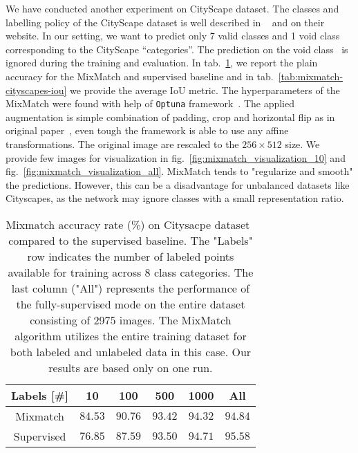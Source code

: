 We have conducted another experiment on CityScape dataset. The classes and labelling policy of the CityScape
dataset is well described in ~\cite{cityscapes-2016} and on their website. In our setting, we want to predict only 
7 valid classes and 1 void class corresponding to the CityScape ``categories''. The prediction on the void class \
is ignored during the training and evaluation. In tab.~\ref{tab:mixmatch-cityscapes}, we report the plain accuracy for 
the MixMatch and supervised baseline and in tab.~\ref{tab:mixmatch-cityscapes-iou} we provide the average $\mathrm{IoU}$ metric. 
The hyperparameters of the MixMatch were found with help of \texttt{Optuna} framework~\cite{optuna-2019}.
The applied augmentation is simple combination of padding, crop and horizontal flip as in original paper~\cite{mixmatch-2019}, even
tough the framework is able to use any affine transformations. The original image are rescaled to the $256 \times 512$ size.
We provide few images for visualization in fig.~\ref{fig:mixmatch_visualization_10} and fig.~\ref{fig:mixmatch_visualization_all}. 
MixMatch tends to "regularize and smooth" the predictions. However, this can be a disadvantage for unbalanced datasets 
like Cityscapes, as the network may ignore classes with a small representation ratio.

\begin{table}[tbh]
    \begin{tabular}{|c|c|c|c|c|c|}
    \hline
    Labels [\#]  & 10 & 100 & 500 & 1000 & All \\
    \hline
    Mixmatch & $84.53$ & $90.76$ & $93.42$ & $94.32$ & $94.84$ \\
    \hline
    Supervised & $76.85$ & $87.59$ & $93.50$ & $94.71$ & $95.58$ \\
    \hline
    \end{tabular}
    \caption[Mixmatch accuracy on CityScape]{Mixmatch accuracy rate (\%) on Citysacpe dataset~\cite{cityscapes-2016} compared to the supervised baseline. The 
    "Labels" row indicates the number of labeled points available for training across 8 class categories. The last 
    column ("All") represents the performance of the fully-supervised mode on the entire dataset consisting of 2975 images. 
    The MixMatch algorithm utilizes the entire training dataset for both labeled and unlabeled data in this case.
    Our results are based only on one run.}
    \label{tab:mixmatch-cityscapes}
\end{table}


